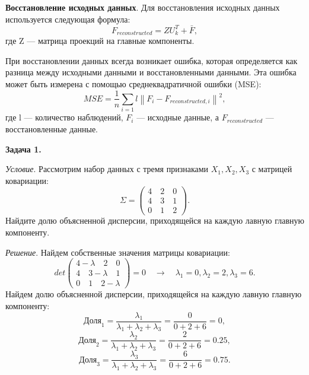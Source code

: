 \textbf{Восстановление исходных данных}. Для восстановления исходных данных используется следующая формула:
\begin{equation}
    F_{reconstructed} = Z U_{k}^{T} + \bar{F}, 
\end{equation}
где Z — матрица проекций на главные компоненты.

При восстановлении данных всегда возникает ошибка, которая определяется как разница между исходными данными и восстановленными данными. Эта ошибка может быть измерена с помощью среднеквадратичной ошибки (MSE):
\begin{equation}
    MSE = \frac{1}{n} \sum_{i = 1}{l} \left\|F_i - F_{reconstructed, i} \right\|^{2},
\end{equation}
где l — количество наблюдений, $F_i$ — исходные данные, а $F_{reconstructed}$ — восстановленные данные.

\textbf{Задача 1.}

\textit{Условие}. Рассмотрим набор данных с тремя признаками $X_1, X_2, X_3$ с матрицей ковариации:
\begin{equation}
    \Sigma = \begin{pmatrix} 4 \quad 2 \quad 0 \\ 4 \quad 3 \quad 1 \\ 0 \quad 1 \quad 2 \end{pmatrix}.
\end{equation}
Найдите долю объясненной дисперсии, приходящейся на каждую лавную главную компоненту.

\textit{Решение}. Найдем собственные значения матрицы ковариации:
\begin{equation}
    det \begin{pmatrix} 4 - \lambda \quad 2 \quad 0 \\ 4 \quad 3 - \lambda \quad 1 \\ 0 \quad 1 \quad 2 - \lambda \end{pmatrix} = 0 \quad \rightarrow \quad \lambda_1 = 0, \lambda_2 = 2, \lambda_3 = 6.
\end{equation}
Найдем долю объясненной дисперсии, приходящейся на каждую лавную главную компоненту:
\begin{equation}
    \text{Доля}_1 = \frac{\lambda_1}{\lambda_1 + \lambda_2 + \lambda_3} = \frac{0}{0 + 2 + 6} = 0,
\end{equation}
\begin{equation}
    \text{Доля}_2 = \frac{\lambda_2}{\lambda_1 + \lambda_2 + \lambda_3} = \frac{2}{0 + 2 + 6} = 0.25,
\end{equation}
\begin{equation}
    \text{Доля}_3 = \frac{\lambda_3}{\lambda_1 + \lambda_2 + \lambda_3} = \frac{6}{0 + 2 + 6} = 0.75.
\end{equation}

